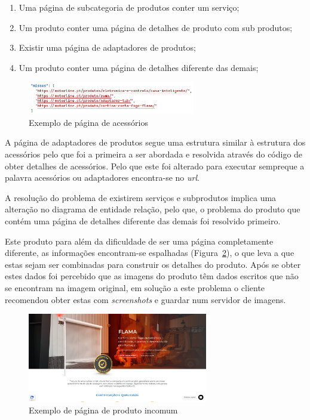 \begin{enumerate}
    \item Uma página de subcategoria de produtos conter um serviço;
    \item Um produto conter uma página de detalhes de produto com sub produtos;
    \item Existir uma página de adaptadores de produtos;
    \item Um produto conter uma página de detalhes diferente das demais;
\end{enumerate}

\begin{figure}[htb]
    \centering
    
    \includegraphics[width=0.65\textwidth]{images/implementacao/scraper/melhor_corrida.png}
    \caption{Exemplo de página de acessórios}
    \label{fig:59}
\end{figure}



A página de adaptadores de produtos segue uma estrutura similar à estrutura dos acessórios pelo que foi a primeira a ser abordada e resolvida através do código de obter detalhes de acessórios. Pelo que este foi alterado para executar sempreque a palavra acessórios ou adaptadores encontra-se no \textit{url}.

A resolução do problema de existirem serviços e subprodutos implica uma alteração no diagrama de entidade relação, pelo que, o problema do produto que contém uma página de detalhes diferente das demais foi resolvido primeiro. 

Este produto para além da dificuldade de ser uma página completamente diferente, as informações encontram-se espalhadas (Figura~\ref*{fig:60}), o que leva a que estas sejam ser combinadas para construir os detalhes do produto.
Após se obter estes dados foi percebido que as imagens do produto têm dados escritos que não se encontram na imagem original, em solução a este problema o cliente recomendou obter estas com \textit{screenshots} e guardar num servidor de imagens.

\begin{figure}[htb]
    \centering
    \includegraphics[width=0.7\textwidth]{images/implementacao/scraper/flama.png}
    \caption{Exemplo de página de produto incomum}
    \label{fig:60}
\end{figure}


